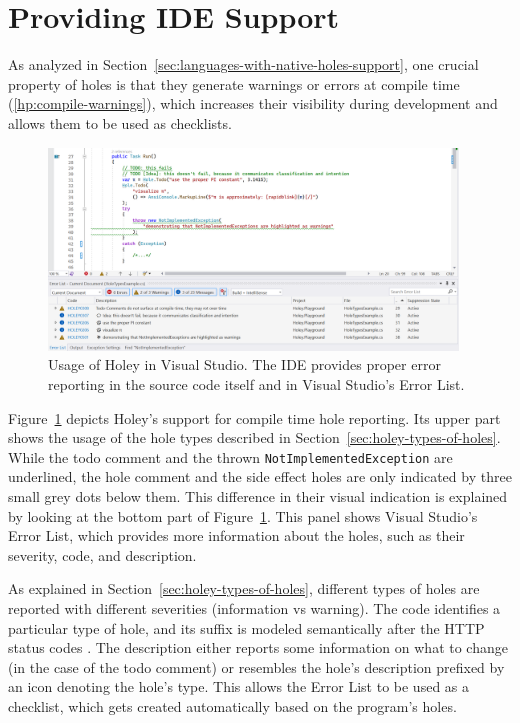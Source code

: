 \section{Providing IDE Support}
\label{sec:providing-ide-support}
As analyzed in Section~\ref{sec:languages-with-native-holes-support}, one crucial property of holes is that they generate warnings or errors at compile time (\ref{hp:compile-warnings}), which increases their visibility during development and allows them to be used as checklists.
%
\begin{figure}[ht]
    \centering
    \includegraphics[width=0.97\textwidth]{images/ide-reporting}
    \caption{Usage of Holey in Visual Studio. The IDE provides proper error reporting in the source code itself and in Visual Studio's Error List.}
    \label{fig:providing-ide-support}
\end{figure}
%
Figure~\ref{fig:providing-ide-support} depicts Holey's support for compile time hole reporting.
Its upper part shows the usage of the hole types described in Section~\ref{sec:holey-types-of-holes}.
While the todo comment and the thrown \verb|NotImplementedException| are underlined, the hole comment and the side effect holes are only indicated by three small grey dots below them.
This difference in their visual indication is explained by looking at the bottom part of Figure~\ref{fig:providing-ide-support}.
This panel shows Visual Studio's Error List, which provides more information about the holes, such as their severity, code, and description.

As explained in Section~\ref{sec:holey-types-of-holes}, different types of holes are reported with different severities (information vs warning).
The code identifies a particular type of hole, and its suffix is modeled semantically after the HTTP status codes \cite{mozilla_http_2023}.
The description either reports some information on what to change (in the case of the todo comment) or resembles the hole's description prefixed by an icon denoting the hole's type.
This allows the Error List to be used as a checklist, which gets created automatically based on the program's holes.

